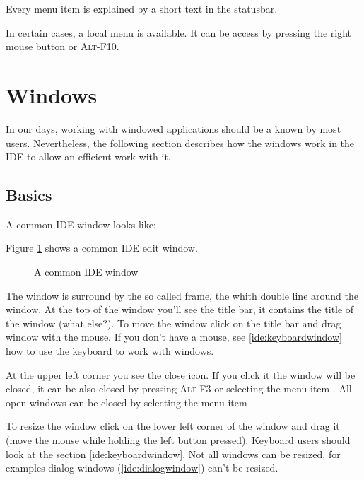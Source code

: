 Every menu item is explained by a short text in the statusbar.

In certain cases, a local menu is available. It can be access by pressing
the right mouse button or \textsc{Alt-F10}.

\section{Windows}
In our days, working with windowed applications should be a known
by most users. Nevertheless, the following section describes how
the windows work in the \fpc IDE to allow an efficient work with it.

\subsection{Basics}
\begin{htmlonly}
A common IDE window looks like:
\end{htmlonly}
\begin{latexonly}
Figure \ref{fig:idewin} shows a common IDE edit window.
\begin{figure}
\caption{A common IDE window}
\label{fig:idewin}
\ifpdf
{}
\else
{}
\fi
\end{figure}
\end{latexonly}
The window is surround by the so called frame, the whith double
line around the window.
At the top of the window you'll see the title bar, it contains the title
of the window (what else?). To move the window click on
the title bar and drag window with the mouse.
If you don't have a mouse, see \ref{ide:keyboardwindow} how
to use the keyboard to work with windows.

At the upper left corner you see the close icon. If you click it the
window will be closed, it can be also closed by pressing \textsc{Alt-F3} or
selecting the menu item . All open windows can be closed
by selecting the menu item 

To resize the window click on the lower left corner of the window
and drag it (move the mouse while holding the left button pressed).
Keyboard users should look at the section \ref{ide:keyboardwindow}.
Not all windows can be resized, for examples dialog windows
(\ref{ide:dialogwindow}) can't be resized.


